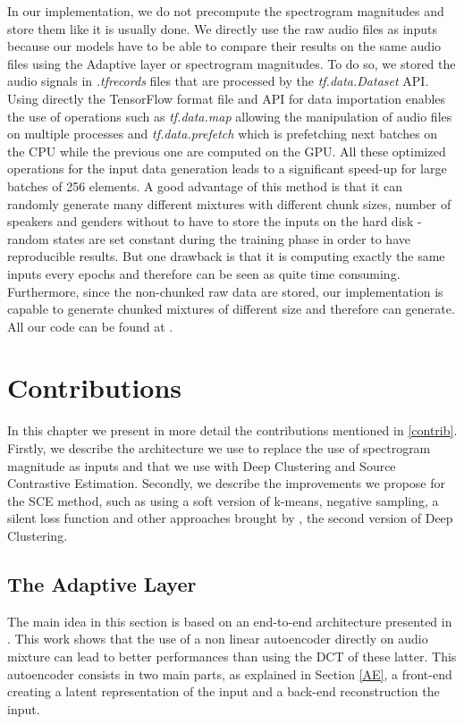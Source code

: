 \documentclass[master, tikz, final,11pt, dvipdfmx]{iscs-thesis}
\begin{document}
In our implementation, we do not precompute the spectrogram magnitudes and store them like it is usually done. We directly use the raw audio files as inputs because our models have to be able to compare their results on the same audio files using the Adaptive layer or spectrogram magnitudes. To do so, we stored the audio signals in \textit{.tfrecords} files that are processed by the \textit{tf.data.Dataset} API. Using directly the TensorFlow format file and API for data importation enables the use of operations such as \textit{tf.data.map} allowing the manipulation of audio files on multiple processes and \textit{tf.data.prefetch} which is prefetching next batches on the CPU while the previous one are computed on the GPU.
All these optimized operations for the input data generation leads to a significant speed-up for large batches of 256 elements. A good advantage of this method is that it can randomly generate many different mixtures with different chunk sizes, number of speakers and genders without to have to store the inputs on the hard disk - random states are set constant during the training phase in order to have reproducible results. But one drawback is that it is computing exactly the same inputs every epochs and therefore can be seen as quite time consuming.
 Furthermore, since the non-chunked raw data are stored, our implementation is capable to generate chunked mixtures of different size and therefore can generate. All our code can be found at \cite{github}.

\chapter{Contributions}

In this chapter we present in more detail the contributions mentioned in \ref{contrib}. Firstly, we describe the architecture we use to replace the use of spectrogram magnitude as inputs and that we use with Deep Clustering and Source Contrastive Estimation. Secondly, we describe the improvements we propose for the SCE method, such as using a soft version of k-means, negative sampling, a silent loss function and other approaches brought by \cite{DPCLV2}, the second version of Deep Clustering.

\section{The Adaptive Layer}
\label{adapt}

The main idea in this section is based on an end-to-end architecture presented in \cite{Adaptive}. This work shows that the use of a non linear autoencoder directly on audio mixture can lead to better performances than using the DCT of these latter. This autoencoder consists in two main parts, as explained in Section \ref{AE}, a front-end creating a latent representation of the input and a back-end reconstruction the input.
\end{document}
